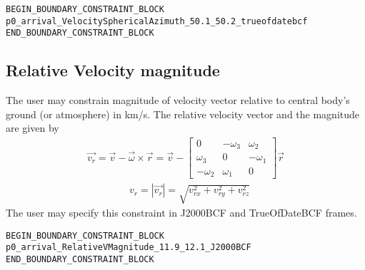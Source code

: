 \documentclass[11pt]{article}
\begin{document}
\begin{verbatim}
BEGIN_BOUNDARY_CONSTRAINT_BLOCK
p0_arrival_VelocitySphericalAzimuth_50.1_50.2_trueofdatebcf
END_BOUNDARY_CONSTRAINT_BLOCK
\end{verbatim}

\subsection{Relative Velocity magnitude}
\label{subsec:relativevelocity_magnitude}
The user may constrain magnitude of velocity vector relative to central body's ground (or atmosphere) in km/s. The relative velocity vector and the magnitude are given by
\begin{equation}
	\label{eq:rel_velocity}
	\begin{aligned}
		\vec{v_r} = \vec{v} - \vec{\omega} \times \vec{r} = \vec{v} -
		\begin{bmatrix}
		0 & -\omega_3 & \omega_2 \\
		\omega_3 & 0 & -\omega_1 \\
		-\omega_2 & \omega_1 & 0
		\end{bmatrix}
		\vec{r}
	\end{aligned}
\end{equation}
\begin{equation}
	\label{eq:rel_velocity_magnitude}
	\begin{aligned}
		&v_r = \left|\vec{v_r}\right| = \sqrt{v_{rx}^{2}+v_{ry}^{2}+v_{rz}^{2}}
	\end{aligned}
\end{equation}
The user may specify this constraint in J2000BCF and TrueOfDateBCF frames.

\begin{verbatim}
BEGIN_BOUNDARY_CONSTRAINT_BLOCK
p0_arrival_RelativeVMagnitude_11.9_12.1_J2000BCF
END_BOUNDARY_CONSTRAINT_BLOCK
\end{verbatim}
\end{document}
